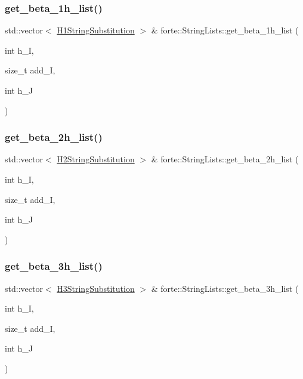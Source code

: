 \subsubsection{\texorpdfstring{get\+\_\+beta\+\_\+1h\+\_\+list()}{get\_beta\_1h\_list()}}
{\footnotesize\ttfamily std\+::vector$<$ \mbox{\hyperlink{structforte_1_1_h1_string_substitution}{H1\+String\+Substitution}} $>$ \& forte\+::\+String\+Lists\+::get\+\_\+beta\+\_\+1h\+\_\+list (\begin{DoxyParamCaption}\item[{int}]{h\+\_\+I,  }\item[{size\+\_\+t}]{add\+\_\+I,  }\item[{int}]{h\+\_\+J }\end{DoxyParamCaption})}

\mbox{\label{classforte_1_1_string_lists_a29a14dabfcd6a58d55b057d1e97d909a}} 
\subsubsection{\texorpdfstring{get\+\_\+beta\+\_\+2h\+\_\+list()}{get\_beta\_2h\_list()}}
{\footnotesize\ttfamily std\+::vector$<$ \mbox{\hyperlink{structforte_1_1_h2_string_substitution}{H2\+String\+Substitution}} $>$ \& forte\+::\+String\+Lists\+::get\+\_\+beta\+\_\+2h\+\_\+list (\begin{DoxyParamCaption}\item[{int}]{h\+\_\+I,  }\item[{size\+\_\+t}]{add\+\_\+I,  }\item[{int}]{h\+\_\+J }\end{DoxyParamCaption})}

\mbox{\label{classforte_1_1_string_lists_a52f6db215396308f827903d65eb49613}} 
\subsubsection{\texorpdfstring{get\+\_\+beta\+\_\+3h\+\_\+list()}{get\_beta\_3h\_list()}}
{\footnotesize\ttfamily std\+::vector$<$ \mbox{\hyperlink{structforte_1_1_h3_string_substitution}{H3\+String\+Substitution}} $>$ \& forte\+::\+String\+Lists\+::get\+\_\+beta\+\_\+3h\+\_\+list (\begin{DoxyParamCaption}\item[{int}]{h\+\_\+I,  }\item[{size\+\_\+t}]{add\+\_\+I,  }\item[{int}]{h\+\_\+J }\end{DoxyParamCaption})}

